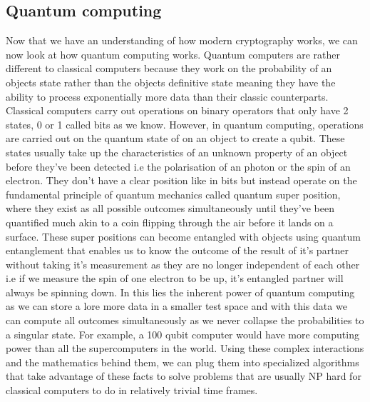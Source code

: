 \documentclass[10pt,a4paper]{article}
\begin{document}
\subsection{Quantum computing}
Now that we have an understanding of how modern cryptography works, we can now look at how quantum computing works. Quantum computers are rather different to classical computers because they work on the probability of an objects state rather than the objects definitive state meaning they have the ability to process exponentially more data than their classic counterparts.
\newline
Classical computers carry out operations on binary operators that only have 2 states, 0 or 1 called bits as we know. However, in quantum computing, operations are carried out on the quantum state of on an object to create a qubit. These states usually take up the characteristics of an unknown property of an object before they've been detected i.e the polarisation of an photon or the spin of an electron. They don't have a clear position like in bits but instead operate on the fundamental principle of quantum mechanics called quantum super position, where they exist as all possible outcomes simultaneously until they've been quantified much akin to a coin flipping through the air before it lands on a surface. 
\newline
These super positions can become entangled with objects using quantum entanglement that enables us to know the outcome of the result of it's partner without taking it's measurement as they are no longer independent of each other i.e if we measure the spin of one electron to be up, it's entangled partner will always be spinning down. In this lies the inherent power of quantum computing as we can store a lore more data in a smaller test space and with this data we can compute all outcomes simultaneously as we never collapse the probabilities to a singular state. For example, a 100 qubit computer would have more computing power than all the supercomputers in the world.%
\newline
Using these complex interactions and the mathematics behind them, we can plug them into specialized algorithms that take advantage of these facts to solve problems that are usually NP hard for classical computers to do in relatively trivial time frames.
\end{document}
